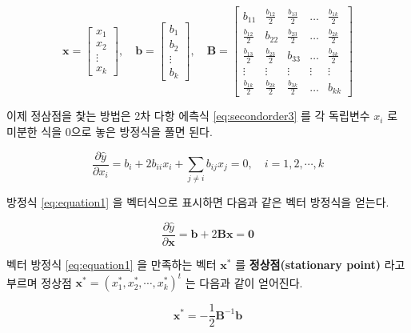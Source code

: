 \documentclass[
]{book}
\newcommand{\pardiff}[2]{\frac{\partial #1}{\partial #2 }}
\newcommand{\bm}[1]{\boldsymbol{\mathbf{#1}}}
\theoremstyle{definition}
\theoremstyle{definition}
\theoremstyle{definition}
\theoremstyle{definition}
\theoremstyle{remark}
\begin{document}
\begin{equation}
\bm x = 
\begin{bmatrix}
x_1 \\
x_2 \\
\vdots \\
x_k
\end{bmatrix}
, \quad
\bm b = 
\begin{bmatrix}
b_1 \\
b_2 \\
\vdots \\
b_k
\end{bmatrix}, \quad
\bm B =
\begin{bmatrix}
b_{11}   & \frac{b_{12}}{2} & \frac{b_{13}}{2}    & \dots & \frac{b_{1k}}{2} \\
\frac{b_{12}}{2} & b_{22}   & \frac{b_{23}}{2}  & \dots & \frac{b_{2k}}{2}  \\
\frac{b_{13}}{2}  & \frac{b_{23}}{2}    & b_{33} & \dots & \frac{b_{3k}}{2} \\
\vdots   & \vdots   & \vdots   & \vdots & \vdots \\
\frac{b_{1k}}{2}  & \frac{b_{2k}}{2}    & \frac{b_{3k}}{2}  & \dots & b_{kk} 
\end{bmatrix}
\label{eq:coef}
\end{equation}

이제 정삼점을 찿는 방법은 2차 다항 에측식 \eqref{eq:secondorder3} 를 각 독립변수 \(x_i\) 로 미분한 식을 0으로 놓은
방정식을 풀면 된다.

\begin{equation}
\pardiff{\hat y}{x_i} =  b_i + 2 b_{ii} x_i + \sum_{j \ne i} b_{ij} x_j =0, \quad i=1,2,\cdots, k
\label{eq:equation1}
\end{equation}

방정식 \eqref{eq:equation1} 을 벡터식으로 표시하면 다음과 같은 벡터 방정식을 얻는다.

\begin{equation}
\pardiff{\hat y}{\bm x} =  \bm b + 2 {\bm B} \bm x = \bm 0
\label{eq:equation1}
\end{equation}

벡터 방정식 \eqref{eq:equation1} 을 만족하는 벡터 \({\bm x}^*\) 를 \textbf{정상점(stationary point)} 라고 부르며 정상점 \({\bm x}^* = (x_1^*, x_2^*, \cdots, x_k^*)^t\) 는 다음과 같이 얻어진다.

\begin{equation}
{\bm x}^* =  - \frac{1}{2} {\bm B}^{-1} \bm b
\label{eq:statpoint}
\end{equation}
\end{document}
